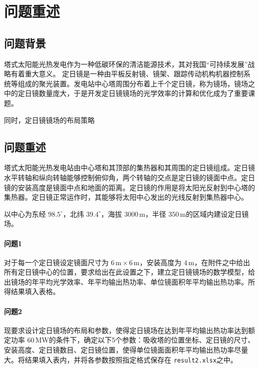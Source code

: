 \section{问题重述}
\subsection{问题背景}
塔式太阳能光热发电作为一种低碳环保的清洁能源技术，其对我国``可持续发展''战略有着重大意义。
定日镜是一种由平板反射镜、镜架、跟踪传动机构机器控制系统等组成的聚光装置。发电站中心塔周围分布着上千个定日镜，称为镜场，镜场之中的定日镜数量庞大，于是开发定日镜镜场的光学效率的计算和优化成为了重要课题。

同时，定日镜镜场的布局策略
\subsection{问题重述}
塔式太阳能光热发电站由中心塔和其顶部的集热器和其周围的定日镜组成。定日镜水平转轴和纵向转轴能够控制俯仰角，两个转轴的交点是定日镜的镜面中点。定日镜的安装高度是镜面中点和地面的距离。定日镜的作用是将太阳光反射到中心塔的集热器。定日镜正常运作时，其能够将太阳中心发出的光线反射到集热器中心。

以中心为东经 \(98.5^\circ\)，北纬 \(39.4 ^\circ\)，海拔 \(3000\, \mathrm{m}\)，半径 \(350 \, \mathrm{m}\)的区域内建设定日镜场。
\paragraph{问题1}
对于每一个定日镜设定镜面尺寸为 \(6 \,\mathrm{m} \times 6 \, \mathrm{m}\)，安装高度为 \(4 \,\mathrm{m}\)，在附件之中给出所有定日镜中心的位置，要求给出在此设置之下，建立定日镜镜场的数学模型，给出镜场的年平均光学效率、年平均输出热功率、单位镜面积年平均输出热功率。所得结果填入表格。
\paragraph{问题2}
现要求设计定日镜场的布局和参数，使得定日镜场在达到年平均输出热功率达到额定功率 \(60 \, \mathrm{MW}\)的条件下，确定以下5个参数：吸收塔的位置坐标、定日镜的尺寸、安装高度、定日镜数目、定日镜位置，使得单位镜面面积年平均输出热功率尽量大。将结果填入表内，并将各参数按照指定格式保存在 \texttt{result2.xlsx}之中。
